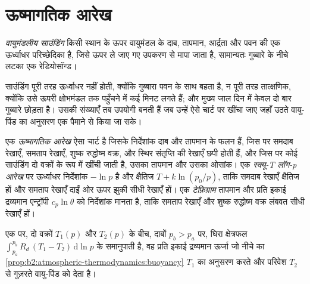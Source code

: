 \section{ऊष्मागतिक आरेख}\label{sec:b2:atmospheric-thermodynamics:diagrams}

\begin{definition}[वायुमंडलीय साउंडिंग]\label{def:b2:atmospheric-thermodynamics:sounding}
\emph{वायुमंडलीय साउंडिंग} किसी स्थान के ऊपर वायुमंडल के
दाब, तापमान, आर्द्रता और पवन की एक ऊर्ध्वाधर परिच्छेदिका है, जिसे ऊपर ले जाए गए
उपकरण से मापा जाता है, सामान्यतः गुब्बारे के नीचे लटका एक रेडियोसॉन्ड।
\end{definition}

साउंडिंग पूरी तरह ऊर्ध्वाधर नहीं होती, क्योंकि गुब्बारा पवन के साथ बहता है, न पूरी तरह
तात्क्षणिक, क्योंकि उसे ऊपरी क्षोभमंडल तक पहुँचने में कई मिनट लगते हैं; और मुख्य
जाल दिन में केवल दो बार गुब्बारे छोड़ता है। उसकी संख्याएँ तब उपयोगी बनती हैं जब उन्हें ऐसे चार्ट पर खींचा जाए
जहाँ उठते वायु-पिंड का अनुसरण एक पैमाने से किया जा सके।

\begin{definition}[ऊष्मागतिक आरेख; स्क्यू-T लॉग-p आरेख; टेफ़िग्राम]\label{def:b2:atmospheric-thermodynamics:diagram}
एक \emph{ऊष्मागतिक आरेख} ऐसा चार्ट है जिसके निर्देशांक
दाब और तापमान के फलन हैं, जिस पर समदाब रेखाएँ, समताप रेखाएँ, शुष्क रुद्धोष्म वक्र,  और स्थिर संतृप्ति  की रेखाएँ छपी होती हैं, और जिस पर कोई साउंडिंग
दो वक्रों के रूप में खींची जाती है, उसका तापमान और उसका ओसांक। एक \emph{स्क्यू-T लॉग-p
आरेख} पर ऊर्ध्वाधर निर्देशांक $-\ln p$ है और क्षैतिज
$T + k\ln(p_0/p)$, ताकि समदाब रेखाएँ क्षैतिज हों और समताप रेखाएँ दाईं ओर ऊपर
झुकी सीधी रेखाएँ हों। एक \emph{टेफ़िग्राम} तापमान और प्रति इकाई
द्रव्यमान एन्ट्रॉपी $c_p\ln\theta$ को निर्देशांक मानता है, ताकि समताप रेखाएँ और शुष्क रुद्धोष्म वक्र लंबवत सीधी
रेखाएँ हों।
\end{definition}

\begin{proposition}[क्षेत्रफल ऊर्जाएँ हैं]\label{prop:b2:atmospheric-thermodynamics:areas}
एक  पर, दो वक्रों $T_1(p)$ और $T_2(p)$ के बीच, दाबों $p_b > p_a$ पर, घिरा
क्षेत्रफल $\int_{p_a}^{p_b} R_d\,(T_1 - T_2)\,\mathrm{d}\ln p$ के समानुपाती है,
वह प्रति इकाई द्रव्यमान ऊर्जा जो नीचे का \cref{prop:b2:atmospheric-thermodynamics:buoyancy}
$T_1$ का अनुसरण करते और परिवेश $T_2$ से गुज़रते वायु-पिंड को देता है।
\end{proposition}

